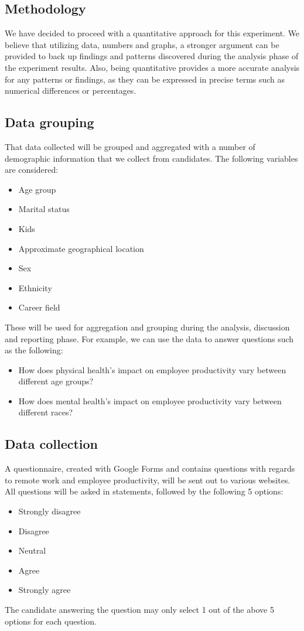 \documentclass[12pt]{article}
\begin{document}
\subsection*{Methodology}
We have decided to proceed with a quantitative approach for this experiment. We believe that utilizing data, numbers and graphs, a stronger argument can be provided to back up findings and patterns discovered during the analysis phase of the experiment results. Also, being quantitative provides a more accurate analysis for any patterns or findings, as they can be expressed in precise terms such as numerical differences or percentages.

\subsection*{Data grouping}

That data collected will be grouped and aggregated with a number of demographic information that we collect from candidates. The following variables are considered:

\begin{itemize}
  \item Age group 
  \item Marital status
  \item Kids
  \item Approximate geographical location
  \item Sex
  \item Ethnicity
  \item Career field
\end{itemize}
These will be used for aggregation and grouping during the analysis, discussion and reporting phase. For example, we can use the data to answer questions such as the following:
\begin{itemize}
  \item How does physical health’s impact on employee productivity vary between different age groups?
  \item How does mental health’s impact on employee productivity vary between different races?
\end{itemize}

\subsection*{Data collection}

A questionnaire, created with Google Forms and contains questions with regards to remote work and employee productivity, will be sent out to various websites. \\
All questions will be asked in statements, followed by the following 5 options: 
\begin{itemize}
  \item Strongly disagree
  \item Disagree
  \item Neutral
  \item Agree
  \item Strongly agree
\end{itemize}
The candidate answering the question may only select 1 out of the above 5 options for each question. 
\end{document}
